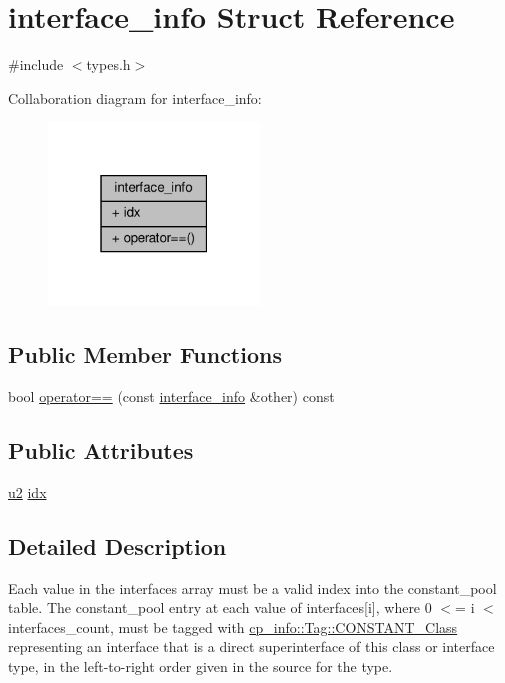 \hypertarget{structinterface__info}{}\section{interface\+\_\+info Struct Reference}
\label{structinterface__info}


{\ttfamily \#include $<$types.\+h$>$}



Collaboration diagram for interface\+\_\+info\+:\nopagebreak
\begin{figure}[H]
\begin{center}
\leavevmode
\includegraphics[width=159pt]{structinterface__info__coll__graph}
\end{center}
\end{figure}
\subsection*{Public Member Functions}
\begin{DoxyCompactItemize}
\item 
bool \hyperlink{structinterface__info_a5c19fb8052240030f2cc96876e78ed07}{operator==} (const \hyperlink{structinterface__info}{interface\+\_\+info} \&other) const
\end{DoxyCompactItemize}
\subsection*{Public Attributes}
\begin{DoxyCompactItemize}
\item 
\hyperlink{types_8h_ae676e9207f57fb921dca7366b2f59c53}{u2} \hyperlink{structinterface__info_a81fa7682cd2b314e79cb6ace44fda442}{idx}
\end{DoxyCompactItemize}


\subsection{Detailed Description}
Each value in the interfaces array must be a valid index into the constant\+\_\+pool table. The constant\+\_\+pool entry at each value of interfaces\mbox{[}i\mbox{]}, where 0 $<$= i $<$ interfaces\+\_\+count, must be tagged with \hyperlink{structcp__info_acdef8472ed83e12e3a87bca8d6001f69adf4763ef84792f4fab0a07fcb179de22}{cp\+\_\+info\+::\+Tag\+::\+C\+O\+N\+S\+T\+A\+N\+T\+\_\+\+Class} representing an interface that is a direct superinterface of this class or interface type, in the left-\/to-\/right order given in the source for the type. 

